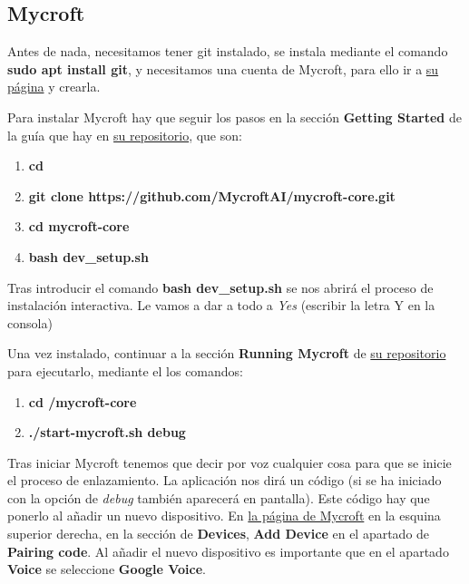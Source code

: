 \subsection{Mycroft}
Antes de nada, necesitamos tener git instalado, se instala mediante el comando \textbf{sudo apt install git}, y necesitamos una cuenta de Mycroft, para ello ir a \href{https://mycroft.ai/}{su página} y crearla.

 

Para instalar Mycroft hay que seguir los pasos en la sección \textbf{Getting Started} de la guía que hay en \href{https://github.com/MycroftAI/mycroft-core}{su repositorio}, que son:
\begin{enumerate}
	\item \textbf{cd \detokenize{~}}
	\item \textbf{git clone https://github.com/MycroftAI/mycroft-core.git}
	\item \textbf{cd mycroft-core}
	\item \textbf{bash dev\_setup.sh}
\end{enumerate}

Tras introducir el comando \textbf{bash dev\_setup.sh} se nos abrirá el proceso de instalación interactiva. Le vamos a dar a todo a \textit{Yes} (escribir la letra Y en la consola) 

Una vez instalado, continuar a la sección \textbf{Running Mycroft} de \href{https://github.com/MycroftAI/mycroft-core}{su repositorio} para ejecutarlo, mediante el los comandos:
\begin{enumerate}
	\item \textbf{cd \detokenize{~}/mycroft-core}
	\item \textbf{./start-mycroft.sh debug}
\end{enumerate}

Tras iniciar Mycroft tenemos que decir por voz cualquier cosa para que se inicie el proceso de enlazamiento. La aplicación nos dirá un código (si se ha iniciado con la opción de \textit{debug} también aparecerá en pantalla). Este código hay que ponerlo al añadir un nuevo dispositivo. En \href{https://home.mycroft.ai}{la página de Mycroft} en la esquina superior derecha, en la sección de \textbf{Devices}, \textbf{Add Device} en el apartado de \textbf{Pairing code}. Al añadir el nuevo dispositivo es importante que en el apartado \textbf{Voice} se seleccione \textbf{Google Voice}.

